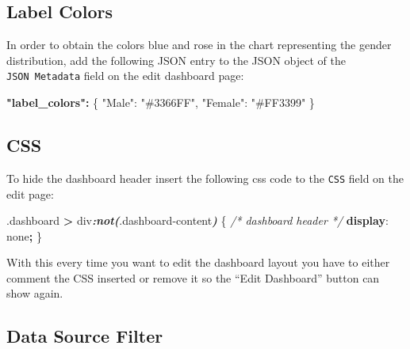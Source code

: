 \documentclass[
]{book}
\newenvironment{Shaded}{\begin{snugshade}}{\end{snugshade}}
\newcommand{\CommentTok}[1]{\textcolor[rgb]{0.56,0.35,0.01}{\textit{#1}}}
\newcommand{\DataTypeTok}[1]{\textcolor[rgb]{0.13,0.29,0.53}{#1}}
\newcommand{\DecValTok}[1]{\textcolor[rgb]{0.00,0.00,0.81}{#1}}
\newcommand{\ErrorTok}[1]{\textcolor[rgb]{0.64,0.00,0.00}{\textbf{#1}}}
\newcommand{\FunctionTok}[1]{\textcolor[rgb]{0.00,0.00,0.00}{#1}}
\newcommand{\InformationTok}[1]{\textcolor[rgb]{0.56,0.35,0.01}{\textbf{\textit{#1}}}}
\newcommand{\KeywordTok}[1]{\textcolor[rgb]{0.13,0.29,0.53}{\textbf{#1}}}
\newcommand{\NormalTok}[1]{#1}
\newcommand{\OperatorTok}[1]{\textcolor[rgb]{0.81,0.36,0.00}{\textbf{#1}}}
\newcommand{\StringTok}[1]{\textcolor[rgb]{0.31,0.60,0.02}{#1}}
\begin{document}
\hypertarget{label-colors-1}{%
\subsection*{Label Colors}\label{label-colors-1}}

In order to obtain the colors blue and rose in the chart representing the gender distribution,
add the following JSON entry to the JSON object of the \texttt{JSON\ Metadata} field on the edit dashboard page:

\begin{Shaded}
\begin{Highlighting}[]
\ErrorTok{"label\_colors":} \FunctionTok{\{}
    \DataTypeTok{"Male"}\FunctionTok{:} \StringTok{"\#3366FF"}\FunctionTok{,} 
    \DataTypeTok{"Female"}\FunctionTok{:} \StringTok{"\#FF3399"}
\FunctionTok{\}}
\end{Highlighting}
\end{Shaded}

\hypertarget{css-8}{%
\subsection*{CSS}\label{css-8}}

To hide the dashboard header insert the following css code to the \texttt{CSS} field on the edit page:

\begin{Shaded}
\begin{Highlighting}[]
\FunctionTok{.dashboard} \OperatorTok{\textgreater{}}\NormalTok{ div}\InformationTok{:not(}\FunctionTok{.dashboard{-}content}\InformationTok{)}\NormalTok{ \{  }\CommentTok{/* dashboard header */}
  \KeywordTok{display}\NormalTok{: }\DecValTok{none}\OperatorTok{;}
\NormalTok{\}}
\end{Highlighting}
\end{Shaded}

With this every time you want to edit the dashboard layout you have to either comment the CSS inserted
or remove it so the ``Edit Dashboard'' button can show again.

\hypertarget{data-source-filter-6}{%
\subsection*{Data Source Filter}\label{data-source-filter-6}}
\end{document}
